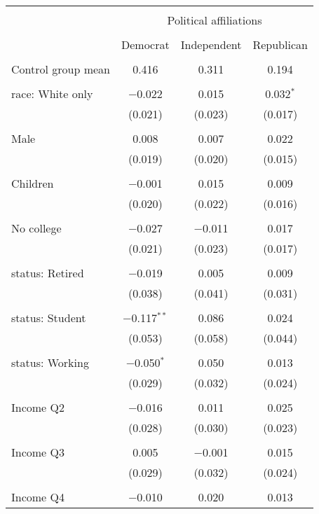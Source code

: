 
\begin{tabular}{@{\extracolsep{5pt}}lccc} 
\\[-1.8ex]\hline 
\hline \\[-1.8ex] 
 & \multicolumn{3}{c}{Political affiliations} \\ 
\cline{2-4} 
\\[-1.8ex] & Democrat & Independent & Republican \\ 
\hline \\[-1.8ex] 
 Control group mean & 0.416 & 0.311 & 0.194  \\ \hline \\[-1.8ex] race: White only & $-$0.022 & 0.015 & 0.032$^{*}$ \\ 
  & (0.021) & (0.023) & (0.017) \\ 
  & & & \\ 
 Male & 0.008 & 0.007 & 0.022 \\ 
  & (0.019) & (0.020) & (0.015) \\ 
  & & & \\ 
 Children & $-$0.001 & 0.015 & 0.009 \\ 
  & (0.020) & (0.022) & (0.016) \\ 
  & & & \\ 
 No college & $-$0.027 & $-$0.011 & 0.017 \\ 
  & (0.021) & (0.023) & (0.017) \\ 
  & & & \\ 
 status: Retired & $-$0.019 & 0.005 & 0.009 \\ 
  & (0.038) & (0.041) & (0.031) \\ 
  & & & \\ 
 status: Student & $-$0.117$^{**}$ & 0.086 & 0.024 \\ 
  & (0.053) & (0.058) & (0.044) \\ 
  & & & \\ 
 status: Working & $-$0.050$^{*}$ & 0.050 & 0.013 \\ 
  & (0.029) & (0.032) & (0.024) \\ 
  & & & \\ 
 Income Q2 & $-$0.016 & 0.011 & 0.025 \\ 
  & (0.028) & (0.030) & (0.023) \\ 
  & & & \\ 
 Income Q3 & 0.005 & $-$0.001 & 0.015 \\ 
  & (0.029) & (0.032) & (0.024) \\ 
  & & & \\ 
 Income Q4 & $-$0.010 & 0.020 & 0.013 \\ 

\end{tabular}
